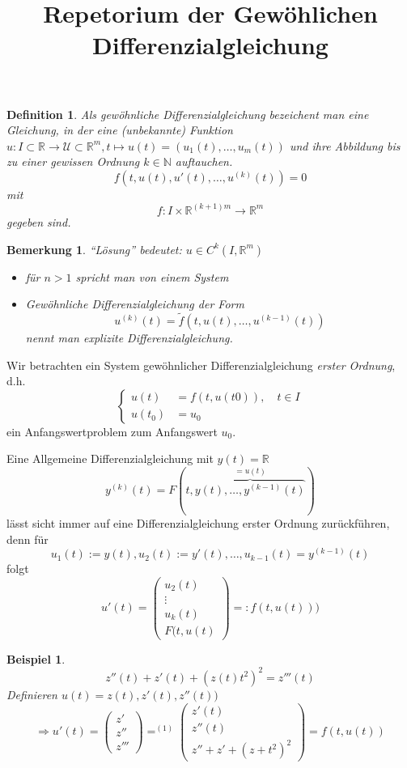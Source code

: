 \documentclass[11pt]{article}
\title{Repetorium der Gew\"ohlichen Differenzialgleichung}
\author{}
\newcommand{\RR}{\mathbb{R}}
\newcommand{\NN}{\mathbb{N}}
\newcommand{\UU}{\mathcal{U}}
\newcounter{myCounter}[section]
\newtheorem{Def}[myCounter]{Definition}
\newtheorem{Bem}[myCounter]{Bemerkung}
\newtheorem{Bsp}[myCounter]{Beispiel}
\begin{document}
\maketitle

\begin{Def}
  Als gew\"ohnliche Differenzialgleichung bezeichent man eine Gleichung, in der eine (unbekannte)
  Funktion $u: I \subset \RR \rightarrow \UU \subset \RR^m , t \mapsto u(t)=
  (u_1(t), \dotsc, u_m(t))$ und ihre Abbildung bis zu einer gewissen Ordnung $
  k \in \NN$ auftauchen. \[
    f(t,u(t), u'(t), \dotsc, u^{(k)}(t)) = 0 \]
  mit \[
    f:I \times \RR^{(k+1)m} \rightarrow \RR^m \]
  gegeben sind.
\end{Def}

\begin{Bem}
  ``L\"osung'' bedeutet: $u\in C^k(I,\RR^m)$
  \begin{itemize}
  \item f\"ur $n > 1$ spricht man von einem System
  \item Gew\"ohnliche Differenzialgleichung der Form \[
    u^{(k)}(t) = \tilde{f}(t,u(t),\dotsc,u^{(k-1)}(t)) \]
    nennt man \emph{explizite} Differenzialgleichung.
  \end{itemize}
\end{Bem}
Wir betrachten ein System gew\"ohnlicher Differenzialgleichung \emph{erster Ordnung}, d.h.\[
  \left\{\begin{aligned} u(t) &= f(t,u(t0)), \quad t \in I \\ u(t_0) &= u_0
  \end{aligned} \right. \]
ein Anfangswertproblem zum Anfangswert $u_0$.


Eine Allgemeine Differenzialgleichung mit $y(t) = \RR$ \[
  y^{(k)}(t) = F(t,\overbrace{y(t),\dotsc,y^{(k-1)}(t)}^{=u(t)}) \]
l\"asst sicht immer auf eine Differenzialgleichung erster Ordnung zur\"uckf\"uhren, denn f\"ur
\[ u_1(t):=y(t), u_2(t) := y'(t), \dotsc, u_{k-1}(t)=y^{(k-1)}(t) \] folgt \[
  u'(t) = \begin{pmatrix} u_2(t) \\ \vdots \\ u_k(t) \\ F(t,u(t) \end{pmatrix} =
: f(t,u(t))) \]

\begin{Bsp}
\[ z''(t) + z'(t) + (z(t)t^2)^2 = z'''(t) \tag{1} \]
Definieren $u(t) = z(t), z'(t), z''(t) )$ \[
  \Rightarrow u'(t) = \begin{pmatrix} z' \\ z'' \\ z''' \end{pmatrix}  
  \mathop{=}^{(1)} \begin{pmatrix} z'(t) \\ z''(t) \\ z'' + z' + (z + t^2)^2
  \end{pmatrix} = f(t,u(t)) \]
\end{Bsp}
\end{document}
